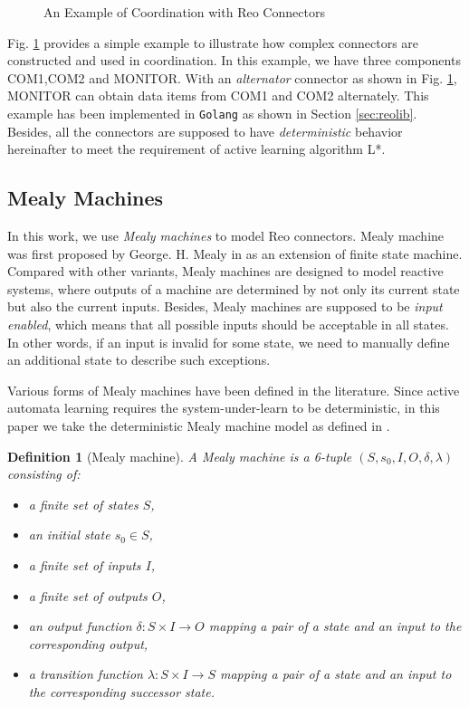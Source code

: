 \documentclass[conference, a4paper]{IEEEtran}
\newtheorem{definition}{Definition}
\begin{document}
\begin{figure}[ht]
  \begin{center}
    
  \end{center}
  \caption{An Example of Coordination with Reo Connectors}
  \label{fig:reoconnector}
\end{figure}

Fig. \ref{fig:reoconnector} provides a simple example to illustrate how complex
connectors are constructed and used in coordination. In this example, we have three components
COM1,COM2 and MONITOR. With an \emph{alternator} connector as shown in Fig.
\ref{fig:reoconnector}, MONITOR can obtain data items from COM1 and COM2 alternately. This example
has been implemented in \texttt{Golang} as shown in Section \ref{sec:reolib}.
Besides, all the connectors are supposed to have \emph{deterministic} behavior hereinafter to meet
the requirement of active learning algorithm L*.


\subsection{Mealy Machines} 

In this work, we use \emph{Mealy machines} to model Reo connectors.
Mealy machine was first proposed by George. H. Mealy in \cite{George1955A} as an extension of finite
state machine. Compared with other variants, Mealy machines are designed to model
reactive systems, where outputs of a machine are determined by not only its current state but also
the current inputs. Besides, Mealy machines are supposed to be \emph{input enabled}, which means
that all possible inputs should be acceptable in all states. In other words, if an input is invalid
for some state, we need to manually define an additional state to describe such exceptions.

Various forms of Mealy machines have been defined in the
literature\cite{George1955A,DBLP:journals/jcss/Broy14,DBLP:conf/sfm/SteffenHM11}. 
Since active automata learning requires the system-under-learn to be deterministic, in
this paper we take the deterministic Mealy machine model as defined in 
\cite{DBLP:conf/sfm/SteffenHM11}. 

\begin{definition}[Mealy machine]
  A Mealy machine is a 6-tuple $(S, s_0, I, O, \delta, \lambda)$ consisting of:
  \begin{itemize}
    \item[-] a finite set of states $S$,
    \item[-] an initial state $s_0\in S$,
    \item[-] a finite set of inputs $I$,
    \item[-] a finite set of outputs $O$,
    \item[-] an output function $\delta :  S \times  I \rightarrow O$ mapping a pair
      of a state and an input to the corresponding output,
    \item[-] a transition function $\lambda : S \times I \rightarrow S$ mapping a pair of a
      state and an input to the corresponding successor state.
  \end{itemize}
\end{definition}
\end{document}
